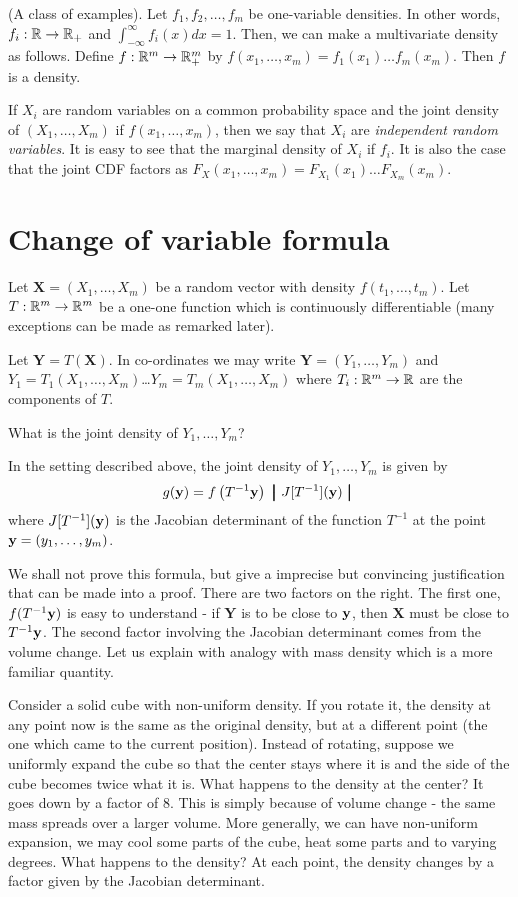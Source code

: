 \documentclass[preprint,  11pt]{amsart}
\def\X{\mathbf{X}}
\def\Y{\mathbf{Y}}
\begin{document}
\beg (A class of examples). Let $f_{1},f_{2},\ldots ,f_{m}$ be one-variable densities. In other words, $f_{i}:\mathbb{R}\rightarrow \mathbb{R}_{+}$ and $\int_{-\infty}^{\infty}f_{i}(x)dx=1$. Then, we can make a multivariate density as follows. Define $f:\mathbb{R}^{m}\rightarrow \mathbb{R}_{+}^{m}$ by $f(x_{1},\ldots ,x_{m})=f_{1}(x_{1})\ldots f_{m}(x_{m})$. Then $f$ is a density.

If $X_{i}$ are random variables on a common probability space and the joint density of $(X_{1},\ldots ,X_{m})$  if $f(x_{1},\ldots ,x_{m})$, then we say that $X_{i}$ are {\em independent random variables}. It is easy to see that the marginal density of $X_{i}$ if $f_{i}$. It is also the case that the joint CDF factors as $F_{X}(x_{1},\ldots ,x_{m})=F_{X_{1}}(x_{1})\ldots F_{X_{m}}(x_{m})$.
\eeg
\section{Change of variable formula}
Let $\X=(X_{1},\ldots ,X_{m})$ be a random vector with density $f(t_{1},\ldots ,t_{m})$. Let $T:\mathbb{R}^{m}\rightarrow \mathbb{R}^{m}$ be a one-one function which is continuously differentiable (many exceptions can be made as remarked later).

Let $\Y=T(\X)$. In co-ordinates we may write $\Y=(Y_{1},\ldots ,Y_{m})$ and $Y_{1}=T_{1}(X_{1},\ldots ,X_{m})$\dots $Y_{m}=T_{m}(X_{1},\ldots ,X_{m})$ where $T_{i}:\mathbb{R}^{m}\rightarrow \mathbb{R}$ are the components of $T$.

 What is the joint density of $Y_{1},\ldots ,Y_{m}$?

 In the setting described above,  the joint density of $Y_{1},\ldots ,Y_{m}$ is given by
$$
g({\bf y})=f\left(T^{-1}{\bf y}\right)\ \pmb{\big|} \  J[T^{-1}]({\bf y})\ \pmb{\big|} \ 
$$
where $J[T^{-1}]({\bf y})$ is the Jacobian determinant of the function $T^{-1}$ at the point ${\bf y}=(y_{1},\ldots ,y_{m})$.

 We shall not prove this formula, but give a imprecise but convincing justification that can be made into a proof. There are two factors on the right.  The first one, $f(T^{-1}{\bf y})$ is easy to understand - if $\Y$ is to be close to ${\bf y}$, then $\X$ must be close to $T^{-1}{\bf y}$. The second factor involving the Jacobian determinant comes from the volume change. Let us explain with analogy with mass density which is a more familiar quantity.

Consider a solid cube with non-uniform density. If you rotate it, the density at any point now is the same as the original density, but at a different point (the one which came to the current position). Instead of rotating, suppose we uniformly expand the cube so that the center stays where it is and the side of the cube becomes twice what it is. What happens to the density at the center? It goes down by a factor of $8$. This is simply because of volume change - the same mass spreads over a larger volume. More generally, we can have non-uniform expansion, we may cool some parts of the cube, heat some parts and to varying degrees. What happens to the density? At each point, the density changes by a factor given by the Jacobian determinant.
\end{document}
